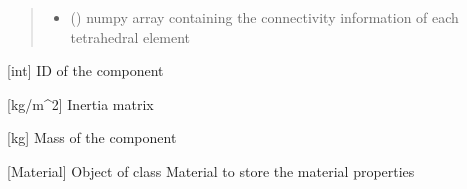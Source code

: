 \documentclass[letterpaper,10pt,english]{sphinxmanual}
\begin{document}
\begin{fulllineitems}
\begin{fulllineitems}
\begin{quote}
\begin{description}
\begin{itemize}
\item {} 
\sphinxAtStartPar
{} () \textendash{} numpy array containing the connectivity information of each tetrahedral element

\end{itemize}

\end{description}\end{quote}

\end{fulllineitems}


\begin{fulllineitems}
\label{\detokenize{modules:component.Component.id}}
\pysigstartsignatures
{}
\pysigstopsignatures
\sphinxAtStartPar
{[}int{]} ID of the component

\end{fulllineitems}


\begin{fulllineitems}
\label{\detokenize{modules:component.Component.inertia}}
\pysigstartsignatures
{}
\pysigstopsignatures
\sphinxAtStartPar
{[}kg/m\textasciicircum{}2{]} Inertia matrix

\end{fulllineitems}


\begin{fulllineitems}
\label{\detokenize{modules:component.Component.mass}}
\pysigstartsignatures
{}
\pysigstopsignatures
\sphinxAtStartPar
{[}kg{]} Mass of the component

\end{fulllineitems}


\begin{fulllineitems}
\label{\detokenize{modules:component.Component.material}}
\pysigstartsignatures
{}
\pysigstopsignatures
\sphinxAtStartPar
{[}Material{]} Object of class Material to store the material properties


\end{fulllineitems}
\end{fulllineitems}
\end{document}
